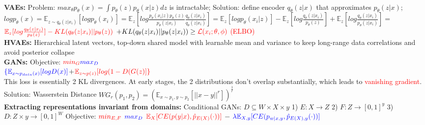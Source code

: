 \\
\textbf{VAEs: } 
Problem: $max_{\theta} p_{\theta}(x) = \int p_{\theta}(z)p_{\theta}(x|z)dz$ is intractable; Solution: define encoder $q_{\theta}(z | x)$ that approximates $p_{\theta}(z|x)$; $log p_{\theta}(x) = \mathbb{E}_{z \sim q_{\theta}(z|x_i)}[log p_{\theta}(x_i)] = \mathbb{E}_z[log\frac{p_{\theta}(x_i|z)p_{\theta}(z)}{p_{\theta}(z|x_i)}\frac{q_{\theta}(z|x_i)}{q_{\theta}(z|x_i)}] = \mathbb{E}_z[log p_{\theta}(x_i | z)] - \mathbb{E}_z[log\frac{q_{\theta}(z|x_i)}{p_\theta(z)}] + \mathbb{E}_z[log\frac{q_{\theta}(z|x_i)}{p_\theta(z|x_i)}] = $\\
$\color{red}{\mathbb{E}_z[log\frac{q_{\theta}(z|x_i)}{p_\theta(z)}] - KL(q_{\theta}(z|x_i) || p_{\theta}(z))}$ $ + KL(q_{\theta}(z|x_i) || p_{\theta}(z|x_i))\geq \color{red}{\mathcal{L}(x_i; \theta, \phi)}$ \textcolor{red}{(ELBO)}\\
\textbf{HVAEs: }Hierarchical latent vectors, top-down shared model with learnable mean and variance to keep long-range data correlations and avoid posterior collapse 
\\
\textbf{GANs: } 
Objective: $\color{red}{min_G}\color{blue}{max_D}$\\$\color{blue}{\{\mathbb{E}_{x\sim p_{data}(x)}[log D(x)]}$$+$$\color{red}{\mathbb{E}_{z\sim p(z)}[log(1-D(G(z)]\}}$ \\
This loss is essentially 2 KL divergences. At early stages, the 2 distributions don't overlap substantially, which leads to \textcolor{red}{vanishing gradient}. Solution: Wasserstein Distance $WG_r(p_1, p_2) = (\mathbb{E}_{x\sim p_1, y\sim p_2}[||x-y||^r])^{\frac{1}{r}}$ \\
\textbf{Extracting representations invariant from domains: }
Conditional GANs: $D \subseteq W \times X \times y$ 1) $E: X \rightarrow Z$ 2) $F: Z \rightarrow [0,1]^y$ 3) $D: Z \times y \rightarrow [0,1]^W$ Objective: $\color{red}{min_{E,F}}$ $\color{blue}{max_D}$ $\color{red}{\mathbb{E}_X[CE(p(y|x), \hat{p}_{E(X)}(\cdot))]}$ $-$ $\color{blue}{\lambda \mathbb{E}_{X,y}[CE(p_{w|x,y}, \hat{p}_{E(X), y}(\cdot))]}$\\
